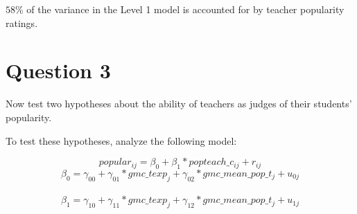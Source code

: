 \documentclass[]{article}
\begin{document}
\(58\)\% of the variance in the Level 1 model is accounted for by
teacher popularity ratings.

\section{Question 3}\label{question-3}

Now test two hypotheses about the ability of teachers as judges of their
students' popularity.

To test these hypotheses, analyze the following model:

\[popular_{ij} = \beta_{0} + \beta_1 * popteach\_c_{ij} + r_{ij}\]
\[\beta_0 = \gamma_{00} + \gamma_{01}*gmc\_texp_j + \gamma_{02}*gmc\_mean\_pop\_t_j + u_{0j}\]\\
\[\beta_1 = \gamma_{10} + \gamma_{11}*gmc\_texp_j + \gamma_{12}*gmc\_mean\_pop\_t_j + u_{1j}\]
\end{document}
